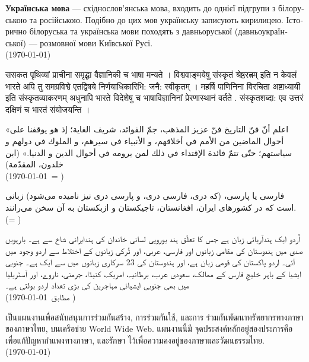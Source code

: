 \documentclass[a4paper]{article}
\begin{document}
\begin{ukrainian}
\textbf{Українська мова} — східнослов'янська мова, входить до однієї підгрупи з білоруською та російською. Подібно до цих мов українську записують кирилицею. Історично білоруська та українська мови походять з давньоруської (давньоукраїнської) — розмовної мови Київської Русі.\\
(\today)
\end{ukrainian}

\begin{sanskrit}
{\Large ससकत} पृथिव्यां प्राचीना समृद्घा वैज्ञानिकी च भाषा मन्यते । विश्ववाङ्‌मयेषु संस्कृतं श्रेष्ठरत्नम् इति न केवलं भारते अपि तु समग्रविश्वे एतद्विषये निर्णयाधिकारिभि: जनै: स्वीकृतम् । महर्षि पाणिनिना विरचिता अष्टाध्यायी इति संस्कृतव्याकरणम्‌ अधुनापि भारते विदेशेषु च भाषाविज्ञानिनां प्रेरणास्‍थानं वर्तते . संस्कृतशब्दा: एव उत्तरं दक्षिणं च भारतं संयोजयन्ति ।
\end{sanskrit}

\begin{Arabic}[]
«اعلم أنّ فنّ التاريخ فنّ عزيز المذهب، جمّ الفوائد، شريف الغاية؛ إذ هو يوقفنا على أحوال الماضين من الأمم في أخلاقهم، و الأنبياء في سيرهم، و الملوك في دولهم و سياستهم؛ حتّى تتمّ فائدة الإقتداء في ذلك لمن يرومه في أحوال الدين و الدنيا.» (ابن خلدون، المقدّمة)\\
(\today\ = \Hijritoday[0])
\end{Arabic}

\begin{farsi}
فارسی یا پارسی، (که دری، فارسی دری، و پارسی دری نیز نامیده می‌شود) زبانی است که
در کشورهای ایران، افغانستان، تاجیکستان و ازبکستان به آن سخن می‌رانند. \\
(\Jalalitoday = \Hijritoday)
\end{farsi}

\pagebreak
\begin{urdu}
اُردو ایک ہندآریائی زبان ہے جس کا تعلّق ہند یوروپی لسانی خاندان کی ہندایرانی شاخ سے ہے۔ بارہویں صدی میں ہندوستان کی مقامی زبانوں اور فارسی، عربی، اور تُرکی زبانوں کے اختلاط سے اردو وجود میں آئی۔ اردو پاکستان کی قومی زبان ہے، اور ہندوستان کی 23 سرکاری زبانوں میں سے ایک ہے۔ جنوبی ایشیا کے باہر خلیجِ فارس کے ممالک، سعودی عرب، برطانیہ، امریکہ، کنیڈا، جرمنی، ناروے، اور آسٹریلیا میں بھی جنوبی ایشیائی مہاجرین کی بڑی تعداد اردو بولتی ہے۔ \\

(\today\ مطابق \Hijritoday[0])
\end{urdu}

\begin{thai}
เป็น\wbr แผนงานเพื่อ\wbr สนับสนุน\wbr การ\wbr ร่วมกัน\wbr สร้าง, การ\wbr ร่วมกันใช้, และ\wbr การ%
ร่วมกัน\wbr พัฒนา\wbr ทรัพยากร\wbr ทาง\wbr ภาษา\wbr ของ\wbr ภาษา\wbr ไทย, บน\wbr เครือข่าย World Wide Web. แผนงานนี้\wbr มี%
จุด\wbr ประสงค์หลั\wbr กอยู่\wbr สอง\wbr ประการคือ เพื่อแก้ปัญหา\wbr กำ\wbr แพง\wbr ทาง\wbr ภาษา, และรักษา%
ไว้เพื่อ\wbr ความค\wbr งอยู่\wbr ของ\wbr ภาษา\wbr และ\wbr วัฒนธรรม\wbr ไทย. \\
(\today)
\end{thai}
\end{document}
